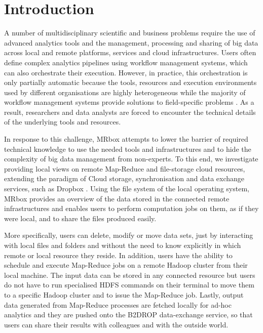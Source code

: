 \section{Introduction}
A number of multidisciplinary scientific and business problems require the use of advanced analytics tools and the management, processing and sharing of big data across local and remote platforms, services and cloud infrastructures. Users often define complex analytics pipelines using workflow management systems, which can also orchestrate their execution. However, in practice, this orchestration is only partially automatic because the tools, resources and execution environments used by different organisations are highly heterogeneous while the majority of workflow management systems provide solutions to field-specific problems \cite{khan2019big}. As a result, researchers and data analysts are forced to encounter the technical details of the underlying tools and resources.

In response to this challenge, MRbox attempts to lower the barrier of required technical knowledge to use the needed tools and infrastructures and to hide the complexity of big data management from non-experts. To this end, we investigate providing local views on remote Map-Reduce and file-storage cloud resources, extending the paradigm of Cloud storage, synchronisation and data exchange services, such as Dropbox \cite{dropbox}. Using the file system of the local operating system, MRbox provides an overview of the data stored in the connected remote infrastructures and enables users to perform computation jobs on them, as if they were local, and to share the files produced easily. 

More specifically, users can delete, modify or move data sets, just by interacting with local files and folders and without the need to know explicitly in which remote or local resource they reside. In addition, users have the ability to schedule and execute Map-Reduce jobs \cite{dean2008mapreduce} on a remote Hadoop cluster \cite{shvachko2010hadoop} from their local machine. The input data can be stored in any connected resource but users do not have to run specialised HDFS commands \cite{shvachko2010hadoop} on their terminal to move them to a specific Hadoop cluster and to issue the Map-Reduce job. Lastly, output data generated from Map-Reduce processes are fetched locally for ad-hoc analytics and they are pushed onto the B2DROP data-exchange service\cite{b2drop}, so that users can share their results with colleagues and with the outside world. 

